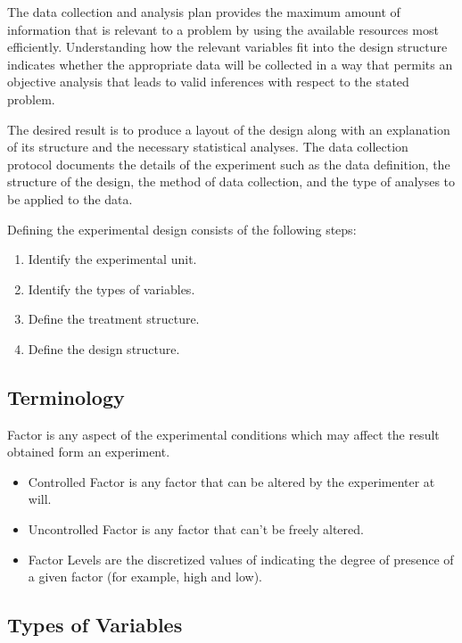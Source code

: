 \documentclass[a4paper,12pt]{article}
\begin{document}
The data collection and analysis plan provides the maximum amount of information that is relevant to a problem by using the available resources most efficiently. Understanding how the relevant variables fit into the design structure indicates whether the appropriate data will be collected in a way that permits an objective analysis that leads to valid inferences with respect to the stated problem. 



The desired result is to produce a layout of the design along with an explanation of its structure and the necessary statistical analyses. The data collection protocol documents the details of the experiment such as the data definition, the structure of the design, the method of data collection, and the type of analyses to be applied to the data.

Defining the experimental design consists of the following steps:
\begin{enumerate}
\item Identify the experimental unit.
\item Identify the types of variables.
\item Define the treatment structure.
\item Define the design structure.
\end{enumerate}
\subsection{Terminology}
Factor is any aspect of the experimental conditions which may affect the result obtained form an experiment. 

\begin{itemize}
\item	Controlled Factor is any factor that can be altered by the experimenter at will.

\item	Uncontrolled Factor is any factor that can’t be freely altered.

\item	Factor Levels are the discretized values of indicating the degree of presence of a given factor (for example, high and low).
\end{itemize}

\subsection{Types of Variables}
\end{document}

